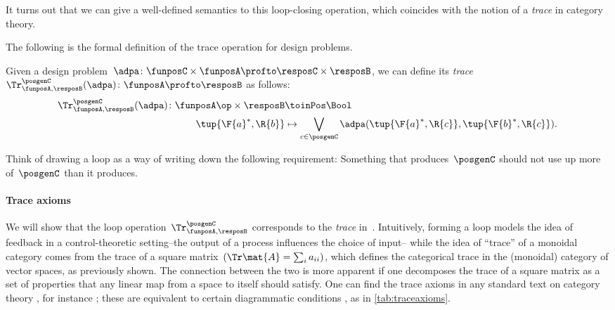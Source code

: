 It turns out that we can give a well-defined semantics to this loop-closing operation, which coincides with the notion of a \emph{trace} in category theory.

The following is the formal definition of the trace operation for design problems.


\begin{definition}
    \label{def:dp-trace}
    Given a design problem~$\adpa\colon \funposC \times \funposA \profto \resposC \times \resposB$, we can define
    its \emph{trace}~$\Tr_{\funposA,\resposB}^\posgenC(\adpa) \colon \funposA \profto \resposB$ as follows:
%
    \begin{equation}
        \label{eq:tracedef}
        \begin{aligned}
            \Tr_{\funposA,\resposB}^\posgenC(\adpa) \colon  \funposA\op \times \resposB &\toinPos \Bool \\
            \tup{\F{a}^*, \R{b}} &\mapsto \bigvee_{c\in \posgenC}
            \adpa(\tup{\F{a}^*, \R{c}},
            \tup{\F{b}^*, \R{c}}).
        \end{aligned}
    \end{equation}
\end{definition}


Think of drawing a loop as a way of writing down the following requirement: Something that produces~$\posgenC$ should not use up more of~$\posgenC$ than it produces.


\paragraph{Trace axioms}
We will show that the loop operation~$\Tr_{\funposA,\resposB}^\posgenC$ corresponds to the \emph{trace} in~\DP.
Intuitively, forming a loop models the idea of feedback in a control-theoretic setting--the output of a process influences the choice of input--
while the idea of ``trace'' of a monoidal category comes from the trace of a square matrix~$(\Tr\mat{A} = \sum_i a_{ii})$, which defines the categorical trace in the (monoidal) category of vector spaces, as previously shown.
The connection between the two is more apparent if one decomposes the trace of a square matrix as a set of properties that any linear map from a space to itself should satisfy. One can find the trace axioms in any standard text on category theory , for instance  \cite{mac2013categories} ;
these are equivalent to certain diagrammatic conditions \cite{joyal96}, as in \cref{tab:traceaxioms}.


